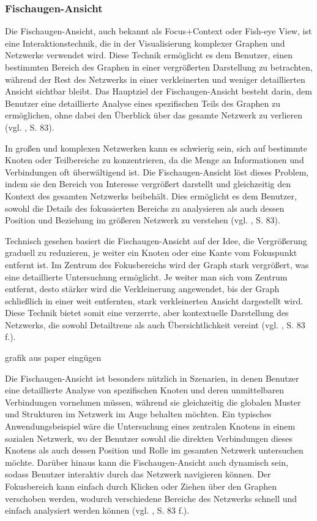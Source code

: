 \subsubsection{Fischaugen-Ansicht}

Die Fischaugen-Ansicht, auch bekannt als Focus+Context oder Fish-eye View, ist eine Interaktionstechnik, die in der Visualisierung komplexer Graphen und Netzwerke verwendet wird. Diese Technik ermöglicht es dem Benutzer, einen bestimmten Bereich des Graphen in einer vergrößerten Darstellung zu betrachten, während der Rest des Netzwerks in einer verkleinerten und weniger detaillierten Ansicht sichtbar bleibt. Das Hauptziel der Fischaugen-Ansicht besteht darin, dem Benutzer eine detaillierte Analyse eines spezifischen Teils des Graphen zu ermöglichen, ohne dabei den Überblick über das gesamte Netzwerk zu verlieren (vgl. \cite{fisheye:Sarkar}, S. 83).

In großen und komplexen Netzwerken kann es schwierig sein, sich auf bestimmte Knoten oder Teilbereiche zu konzentrieren, da die Menge an Informationen und Verbindungen oft überwältigend ist. Die Fischaugen-Ansicht löst dieses Problem, indem sie den Bereich von Interesse vergrößert darstellt und gleichzeitig den Kontext des gesamten Netzwerks beibehält. Dies ermöglicht es dem Benutzer, sowohl die Details des fokussierten Bereichs zu analysieren als auch dessen Position und Beziehung im größeren Netzwerk zu verstehen (vgl. \cite{fisheye:Sarkar}, S. 83).

Technisch gesehen basiert die Fischaugen-Ansicht auf der Idee, die Vergrößerung graduell zu reduzieren, je weiter ein Knoten oder eine Kante vom Fokuspunkt entfernt ist. Im Zentrum des Fokusbereichs wird der Graph stark vergrößert, was eine detaillierte Untersuchung ermöglicht. Je weiter man sich vom Zentrum entfernt, desto stärker wird die Verkleinerung angewendet, bis der Graph schließlich in einer weit entfernten, stark verkleinerten Ansicht dargestellt wird. Diese Technik bietet somit eine verzerrte, aber kontextuelle Darstellung des Netzwerks, die sowohl Detailtreue als auch Übersichtlichkeit vereint (vgl. \cite{fisheye:Sarkar}, S. 83 f.).

grafik aus paper eingügen

Die Fischaugen-Ansicht ist besonders nützlich in Szenarien, in denen Benutzer eine detaillierte Analyse von spezifischen Knoten und deren unmittelbaren Verbindungen vornehmen müssen, während sie gleichzeitig die globalen Muster und Strukturen im Netzwerk im Auge behalten möchten. Ein typisches Anwendungsbeispiel wäre die Untersuchung eines zentralen Knotens in einem sozialen Netzwerk, wo der Benutzer sowohl die direkten Verbindungen dieses Knotens als auch dessen Position und Rolle im gesamten Netzwerk untersuchen möchte. Darüber hinaus kann die Fischaugen-Ansicht auch dynamisch sein, sodass Benutzer interaktiv durch das Netzwerk navigieren können. Der Fokusbereich kann einfach durch Klicken oder Ziehen über den Graphen verschoben werden, wodurch verschiedene Bereiche des Netzwerks schnell und einfach analysiert werden können (vgl. \cite{fisheye:Sarkar}, S. 83 f.).


